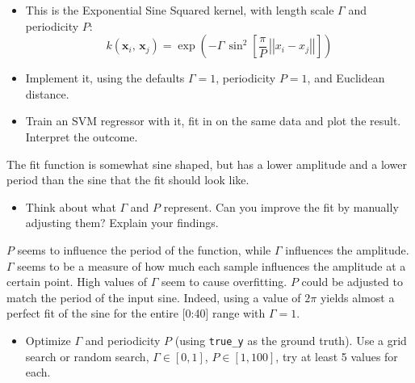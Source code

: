 \documentclass[11pt]{article}
\providecommand{\tightlist}{%
      \setlength{\itemsep}{0pt}\setlength{\parskip}{0pt}}
\begin{document}
\begin{enumerate}
  \begin{itemize}
  \tightlist
  \item
    This is the Exponential Sine Squared kernel, with length scale
    \(\Gamma\) and periodicity \(P\):
    \[k(\mathbf{x}_i,\,\mathbf{x}_j) = \exp \left( -\Gamma\,\sin^2\left[\frac{\pi}{P}\,\left|\left|x_i-x_j\right|\right|\right]\right)\]
  \item
    Implement it, using the defaults \(\Gamma=1\), periodicity \(P=1\),
    and Euclidean distance.
  \item
    Train an SVM regressor with it, fit in on the same data and plot the
    result. Interpret the outcome.
  \end{itemize}

  The fit function is somewhat sine shaped, but has a lower amplitude
  and a lower period than the sine that the fit should look like.

  \begin{itemize}
  \tightlist
  \item
    Think about what \(\Gamma\) and \(P\) represent. Can you improve the
    fit by manually adjusting them? Explain your findings.
  \end{itemize}

  \(P\) seems to influence the period of the function, while \(\Gamma\)
  influences the amplitude. \(\Gamma\) seems to be a measure of how much
  each sample influences the amplitude at a certain point. High values
  of \(\Gamma\) seem to cause overfitting. \(P\) could be adjusted to
  match the period of the input sine. Indeed, using a value of \(2\pi\)
  yields almost a perfect fit of the sine for the entire {[}0:40{]}
  range with \(\Gamma = 1\).

  \begin{itemize}
  \tightlist
  \item
    Optimize \(\Gamma\) and periodicity \(P\) (using \texttt{true\_y} as
    the ground truth). Use a grid search or random search,
    \(\Gamma \in [0,1]\), \(P \in [1,100]\), try at least 5 values for
    each.
  \end{itemize}
\end{enumerate}
\end{document}
